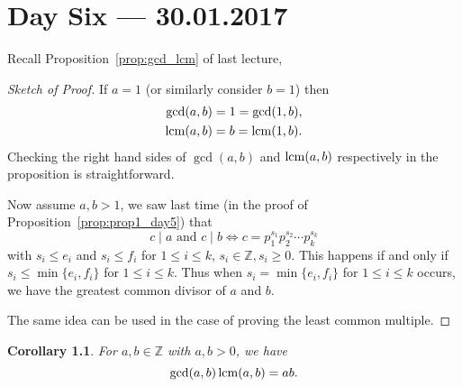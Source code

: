 \documentclass{amsbook}
\theoremstyle{plain}
\newtheorem{corollary}[theorem]{Corollary}
\theoremstyle{definition}
\theoremstyle{remark}
\numberwithin{equation}{chapter}
\numberwithin{figure}{chapter}
\begin{document}
\chapter[Lecture Six]{Day Six \hfill {\footnotesize \rm --- 30.01.2017}}

Recall Proposition~\ref{prop:gcd_lcm} of last lecture,

\gcdlcm*
\begin{proof}[Sketch of Proof]\renewcommand*{\qedsymbol}{\ensuremath{\blacksquare}}
If $a = 1$ (or similarly consider $b = 1$) then 
\begin{align}
\gcd (a, b) &= 1 = \gcd (1, b), \\
{\rm lcm} (a, b) &= b = {\rm lcm} (1, b).
\end{align}
Checking the right hand sides of $\gcd (a, b)$ and ${\rm lcm} (a, b)$ respectively in the proposition is straightforward. 

Now assume $a, b > 1$, we saw last time (in the proof of Proposition~\ref{prop:prop1_day5}) that 
\[
c \mid a \text{ and } c \mid b \iff c = p_1^{s_1} p_2^{s_2} \cdots p_k^{s_k}
\]
with $s_i \leqslant e_i $ and $s_i \leqslant f_i$ for $1 \leqslant i \leqslant k$, $s_i \in \mathbb{Z}, s_i \geqslant0$. This happens if and only if $s_i \leqslant \min \{e_i, f_i\}$ for $1 \leqslant i \leqslant k$. Thus when $s_i = \min \{e_i, f_i\}$ for $1 \leqslant i \leqslant k$ occurs, we have the greatest common divisor of $a$ and $b$. 

The same idea can be used in the case of proving the least common multiple.
\end{proof}
\begin{corollary}
For $a, b \in \mathbb{Z}$ with $a, b > 0$, we have 
\[
\gcd(a, b) \, {\rm lcm}(a, b) = ab.
\]
\end{corollary}
\end{document}
